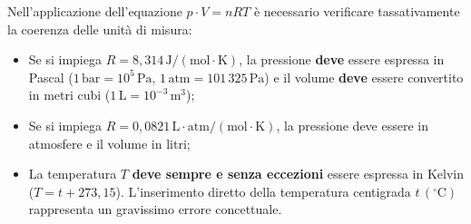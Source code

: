 \documentclass[11pt,a4paper,oneside]{report}
\begin{document}
\begin{avviso}
Nell'applicazione dell'equazione $p \cdot V = n R T$ \`e necessario verificare tassativamente la coerenza delle unit\`a di misura:
\begin{itemize}
  \item Se si impiega $R = 8{,}314\,\text{J}/(\text{mol}\cdot\text{K})$, la pressione \textbf{deve} essere espressa in Pascal ($1\,\text{bar} = 10^5\,\text{Pa}$, $1\,\text{atm} = 101\,325\,\text{Pa}$) e il volume \textbf{deve} essere convertito in metri cubi ($1\,\text{L} = 10^{-3}\,\text{m}^3$);
  \item Se si impiega $R = 0{,}0821\,\text{L}\cdot\text{atm}/(\text{mol}\cdot\text{K})$, la pressione deve essere in atmosfere e il volume in litri;
  \item La temperatura $T$ \textbf{deve sempre e senza eccezioni} essere espressa in Kelvin ($T = t + 273{,}15$). L'inserimento diretto della temperatura centigrada $t\,(^\circ\text{C})$ rappresenta un gravissimo errore concettuale.
\end{itemize}
\end{avviso}
\end{document}
